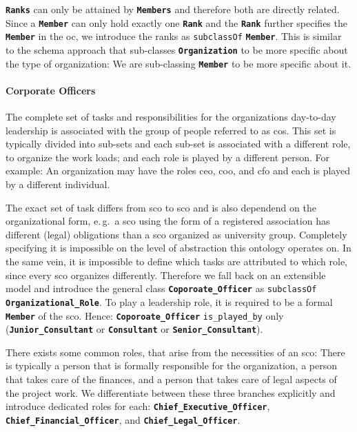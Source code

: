 \documentclass[a4paper, DIV=13, BCOR=0cm]{scrbook}
\newcommand{\eg}{e.\,g.\ }
\newcommand{\class}[1]{\texttt{\textbf{#1}}}
\newcommand{\relation}[1]{\texttt{#1}}
\begin{document}
\class{Ranks} can only be attained by \class{Members} and therefore both are directly related. Since a \class{Member} can only hold exactly one \class{Rank} and the \class{Rank} further specifies the \class{Member} in the \gls{oc}, we introduce the ranks as \relation{subclassOf} \class{Member}. This is similar to the \gls{schema} approach that sub-classes \class{Organization} to be more specific about the type of organization: We are sub-classing \class{Member} to be more specific about it.

\paragraph{Corporate Officers}
The complete set of tasks and responsibilities for the organizations day-to-day leadership is associated with the group of people referred to as \glspl{co}. This set is typically divided into sub-sets and each sub-set is associated with a different role, to organize the work loads; and each role is played by a different person. For example: An organization may have the roles \gls{ceo}, \gls{coo}, and \gls{cfo} and each is played by a different individual.

The exact set of task differs from \gls{sco} to \gls{sco} and is also dependend on the organizational form, \eg a \gls{sco} using the form of a registered association has different (legal) obligations than a \gls{sco} organized as university group. Completely specifying it is impossible on the level of abstraction this ontology operates on. In the same vein, it is impossible to define which tasks are attributed to which role, since every \gls{sco} organizes differently. Therefore we fall back on an extensible model and introduce the general class \class{Coporoate\_Officer} as \relation{subclassOf} \class{Organizational\_Role}. To play a leadership role, it is required to be a formal \class{Member} of the \gls{sco}. Hence: \class{Coporoate\_Officer} \relation{is\_played\_by} only
(\class{Junior\_Consultant} or \class{Consultant} or \class{Senior\_Consultant}).

There exists some common roles, that arise from the necessities of an \gls{sco}: There is typically a person that is formally responsible for the organization, a person that takes care of the finances, and a person that takes care of legal aspects of the project work. We differentiate between these three branches explicitly and introduce dedicated roles for each: \class{Chief\_Executive\_Officer}, \class{Chief\_Financial\_Officer}, and \class{Chief\_Legal\_Officer}.
\end{document}
